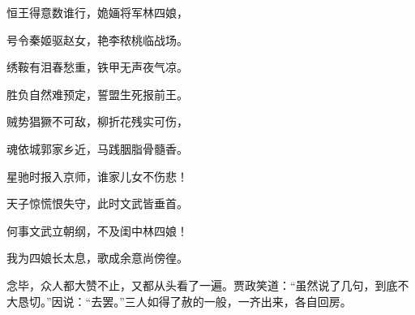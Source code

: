 \begin{poem}
    \begin{pl}
        恒王得意数谁行，姽婳将军林四娘，
    \end{pl}
    \begin{pl}
        号令秦姬驱赵女，艳李秾桃临战场。
    \end{pl}
    \begin{pl}
        绣鞍有泪春愁重，铁甲无声夜气凉。
    \end{pl}
    \begin{pl}
        胜负自然难预定，誓盟生死报前王。
    \end{pl}
    \begin{pl}
        贼势猖獗不可敌，柳折花残实可伤，
    \end{pl}
    \begin{pl}
        魂依城郭家乡近，马践胭脂骨髓香。
    \end{pl}
    \begin{pl}
        星驰时报入京师，谁家儿女不伤悲！
    \end{pl}
    \begin{pl}
        天子惊慌恨失守，此时文武皆垂首。
    \end{pl}
    \begin{pl}
        何事文武立朝纲，不及闺中林四娘！
    \end{pl}
    \begin{pl}
        我为四娘长太息，歌成余意尚傍徨。
    \end{pl}
\end{poem}

\begin{parag}
    念毕，众人都大赞不止，又都从头看了一遍。贾政笑道：“虽然说了几句，到底不大恳切。”因说：“去罢。”三人如得了赦的一般，一齐出来，各自回房。
\end{parag}


